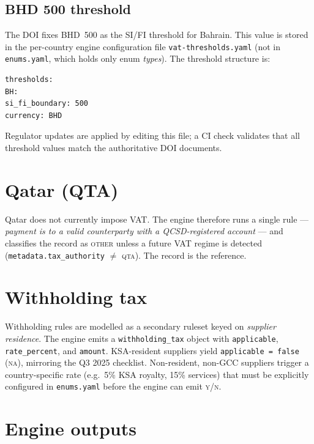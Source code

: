 \documentclass[11pt,a4paper,twoside]{report}
\newcommand{\corpus}{}
\begin{document}
\subsection{BHD 500 threshold}

The DOI fixes BHD~500 as the SI/FI threshold for Bahrain. This value is
stored in the per-country engine configuration file
\texttt{vat-thresholds.yaml} (not in \texttt{enums.yaml}, which holds
only enum \emph{types}). The threshold structure is:

\begin{lstlisting}[basicstyle=\ttfamily\small]
thresholds:
BH:
si_fi_boundary: 500
currency: BHD
\end{lstlisting}

Regulator updates are applied by editing this file; a CI check validates
that all threshold values match the authoritative DOI documents.

\section{Qatar (QTA)}

Qatar does not currently impose VAT. The engine therefore runs a single
rule --- \emph{payment is to a valid counterparty with a QCSD-registered
account} --- and classifies the record as \textsc{other} unless a
future VAT regime is detected (\texttt{metadata.tax\_authority}
$\neq$ \textsc{qta}). The
\corpus{}
record is the reference.

\section{Withholding tax}

Withholding rules are modelled as a secondary ruleset keyed on
\emph{supplier residence}. The engine emits a
\texttt{withholding\_tax} object with \texttt{applicable}, \texttt{rate\_percent},
and \texttt{amount}. KSA-resident suppliers yield
\texttt{applicable~=~false} (\textsc{na}), mirroring the Q3 2025
checklist. Non-resident, non-GCC suppliers trigger a country-specific
rate (e.g.\ 5\% KSA royalty, 15\% services) that must be explicitly
configured in \texttt{enums.yaml} before the engine can emit
\textsc{y}/\textsc{n}.

\section{Engine outputs}
\end{document}
